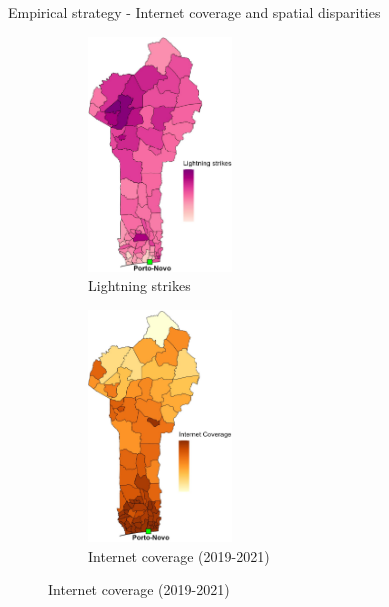 \documentclass[10pt]{beamer}
\begin{document}
\begin{frame}{{\fontsize{13}{12}\selectfont
    Empirical strategy - Internet coverage and spatial disparities}}
    \begin{figure}
        \centering
        \caption{Example: Benin Lightning Strikes and Internet Coverage}
        
        \begin{subfigure}{0.45\textwidth}
            \centering
            \includegraphics[width=3.8cm]{lightning_strikes.jpg}
            \caption{Lightning strikes}
        \end{subfigure}
        \hspace{0.02\textwidth}
        \begin{subfigure}{0.45\textwidth}
            \centering
            \includegraphics[width=3.8cm]{internet_coverage_w8.jpg}
            \caption{Internet coverage (2019-2021)}
        \end{subfigure}
        
    \end{figure}
\end{frame}
\end{document}
